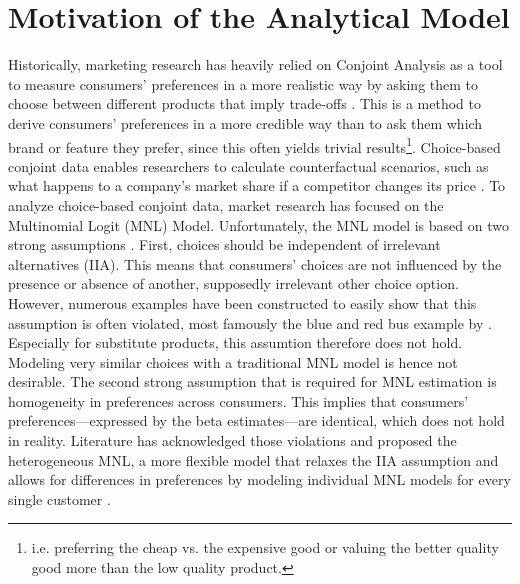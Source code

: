 \documentclass[12pt,a4paper]{article}
\begin{document}
\section{Motivation of the Analytical Model} \label{sec_motivation}
Historically, marketing research has heavily relied on Conjoint Analysis as a tool to measure consumers' preferences in a more realistic way by asking them to choose between different products that imply trade-offs \citep{greenConjointAnalysisMarketing1990}.
This is a method to derive consumers' preferences in a more credible way than to ask them which brand or feature they prefer,
since this often yields trivial results\footnote{i.e. preferring the cheap vs. the expensive good or valuing the better quality good more than the low quality product.}.
Choice-based conjoint data enables researchers to calculate counterfactual scenarios, such as what happens to a company's market share if a competitor changes its price \citep{huberDealingProductSimilarity2001}.
To analyze choice-based conjoint data, market research has focused on the Multinomial Logit (MNL) Model.
Unfortunately, the MNL model is based on two strong assumptions \citep{elrodEmpiricalComparisonRatingsBased1992}.
First, choices should be independent of irrelevant alternatives (IIA).
This means that consumers' choices are not influenced by the presence or absence of another, supposedly irrelevant other choice option.
However, numerous examples have been constructed to easily show that this assumption is often violated, most famously the blue and red bus example by \cite{mcfaddenConditionalLogitAnalysis1973}.
Especially for substitute products, this assumtion therefore does not hold. 
Modeling very similar choices with a traditional MNL model is hence not desirable.
The second strong assumption that is required for MNL estimation is homogeneity in preferences across consumers.
This implies that consumers' preferences---expressed by the beta estimates---are identical, which does not hold in reality. Literature has acknowledged those violations and proposed the heterogeneous MNL, a more flexible model that relaxes the IIA assumption and allows for differences in preferences by modeling individual MNL models for every single customer \citep{steckelHeterogeneousConditionalLogit1988}.
\end{document}
